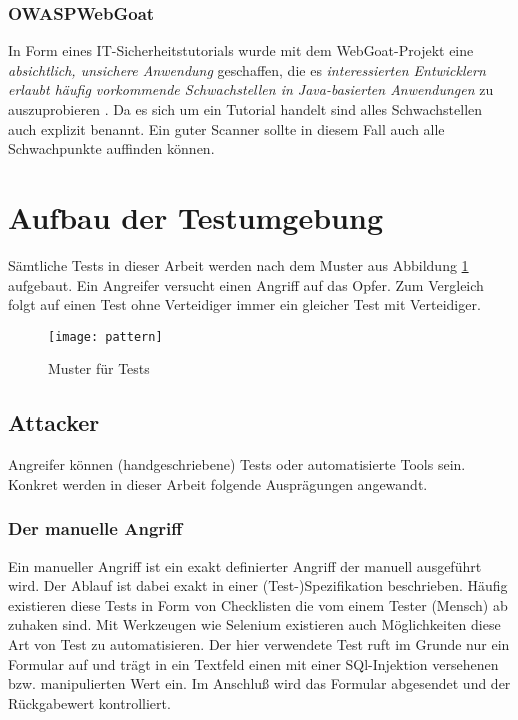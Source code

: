 \subsubsection{OWASP\textregistered WebGoat}

In Form eines IT-Sicherheitstutorials wurde mit dem WebGoat-Projekt eine \emph{absichtlich, unsichere Anwendung} geschaffen, die es \emph{interessierten Entwicklern erlaubt häufig vorkommende Schwachstellen in Java-basierten Anwendungen} zu auszuprobieren \cite{owaspgoat}. Da es sich um ein Tutorial handelt sind alles Schwachstellen auch explizit benannt. Ein guter Scanner sollte in diesem Fall auch alle Schwachpunkte auffinden können. 


\section{Aufbau der Testumgebung}

Sämtliche Tests in dieser Arbeit werden nach dem Muster aus Abbildung \ref{fig.pattern} aufgebaut. Ein \glqq Angreifer\grqq{} versucht einen Angriff auf das \glqq Opfer\grqq. Zum Vergleich folgt auf einen Test ohne \glqq Verteidiger\grqq{} immer ein gleicher Test mit Verteidiger.

\begin{figure}[bht]
  \begin{center}
    \texttt{[image: pattern]}
    \caption{Muster für Tests}
    \label{fig.pattern}
  \end{center}
\end{figure}

\subsection{Attacker}
Angreifer können (handgeschriebene) Tests oder automatisierte Tools sein. Konkret werden in dieser Arbeit folgende Ausprägungen angewandt.

\subsubsection{Der manuelle Angriff}

Ein manueller Angriff ist ein exakt definierter Angriff der manuell ausgeführt wird. Der Ablauf ist dabei exakt in einer (Test-)Spezifikation beschrieben. Häufig existieren diese Tests in Form von Checklisten die vom einem Tester (Mensch) ab zuhaken sind. Mit Werkzeugen wie Selenium existieren auch Möglichkeiten diese Art von Test zu automatisieren. Der hier verwendete Test ruft im Grunde nur ein Formular auf und trägt in ein Textfeld einen mit einer SQl-Injektion versehenen bzw. manipulierten Wert ein. Im Anschluß wird das Formular abgesendet und der Rückgabewert kontrolliert.

